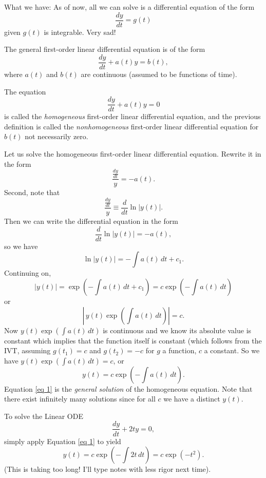 What we have: As of now, all we can solve is a differential equation of the form \[
    \frac{dy}{dt}=g(t)
\]
given $g(t)$ is integrable. Very sad!
\begin{definition}
    The general first-order linear differential equation is of the form \[
        \frac{dy}{dt}+a(t)y=b(t),
    \]
    where $a(t)$ and $b(t)$ are continuous (assumed to be functions of time).
\end{definition}
\begin{definition}
    The equation \[
        \frac{dy}{dt}+a(t)y=0
    \]
    is called the \emph{homogeneous} first-order linear differential equation, and the previous definition is called the \emph{nonhomogeneous} first-order linear differential equation for $b(t)$ not necessarily zero.
\end{definition}
\begin{example}
    Let us solve the homogeneous first-order linear differential equation. Rewrite it in the form \[
        \frac{\frac{dy}{dt}}{y}=-a(t).
    \]
    Second, note that \[
        \frac{\frac{dy}{dt}}{y}\equiv \frac{d}{dt}\ln |y(t)|.
    \] Then we can write the differential equation in the form \[
    \frac{d}{dt}\ln |y(t)| = -a(t),
    \] so we have \[
    \ln|y(t)|= - \int a(t) \, dt + c_1.
    \] Continuing on, \[
    |y(t)|=\exp\left( -\int a(t) \, dt + c_1 \right) = c \exp \left( - \int a(t) \, dt \right) 
    \]
    or \[
        \left| \, y(t)\exp\left( \int a(t) \, dt \right)  \right| = c.
    \]
    Now $y(t)\exp \left( \int a(t) \, dt \right) $ is continuous and we know its absolute value is constant which implies that the function itself is constant (which follows from the IVT, assuming $g(t_1)=c$ and $g(t_2)=-c$ for $g$ a function, $c$ a constant. So we have $y(t)\exp\left( \int a(t) \, dt \right) = c$, or 
    \begin{equation}\label{eq 1}
        y(t) = c \exp \left( - \int a(t) \, dt \right) .
    \end{equation}
    Equation \eqref{eq 1} is the \emph{general solution} of the homogeneous equation. Note that there exist infinitely many solutions since for all $c$ we have a distinct $y(t)$.
\end{example}
\begin{example}
    To solve the Linear ODE \[
    \frac{dy}{dt}+2ty=0,
    \]
    simply apply Equation \eqref{eq 1} to yield \[
        y(t)=c\exp\left( -\int 2t \, dt \right) = c\exp\left(-t^2 \right) .
    \] (This is taking too long! I'll type notes with less rigor next time).
\end{example}
